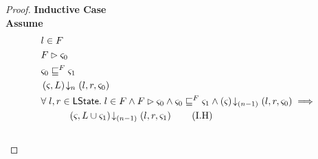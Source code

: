 \begin{lemma}[]
\begin{proof}
\noindent\textbf{Inductive Case}\\
\textbf{Assume}
\begin{align}
	&l \in F \label{L2:Ass1}\\
	&F \fences \amod{0} \label{L2:Ass2}\\
	&\amod{0} \weakenI{F} \amod{1}\label{L2:Ass4}\\
	& \extendsAMUpto{\amod{}, L}{n}{l}{r}{\amod{0}} \label{L2:Ass5}\\
%
	&\for{l, r \in \LState} l \in F \land F \fences \amod{0} \land \amod{0} \weakenI{F} \amod{1} \land \extendsAMUpto{\amod{}}{(n-1)}{l}{r}{\amod{0}}
	\implies \nonumber\\
	&\hspace*{1cm}\extendsAMUpto{\amod{}, L \cup \amod{1}}{(n-1)}{l}{r}{\amod{1}} \tag{I.H}\label{L2:I.H}\\\nonumber
\end{align}


\end{proof}
\end{lemma}
